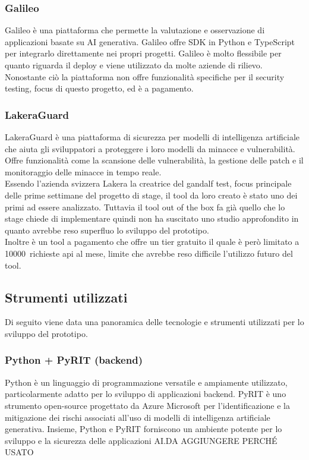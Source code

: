 \subsubsection*{Galileo}
Galileo è una piattaforma che permette la valutazione e osservazione di applicazioni basate su AI generativa. Galileo offre SDK in Python e TypeScript per integrarlo direttamente nei propri progetti. Galileo è molto flessibile per quanto riguarda il deploy e viene utilizzato da molte aziende di rilievo. Nonostante ciò la piattaforma non offre funzionalità specifiche per il security testing, focus di questo progetto, ed è a pagamento.

\subsubsection*{LakeraGuard}
LakeraGuard è una piattaforma di sicurezza per modelli di intelligenza artificiale che aiuta gli sviluppatori a proteggere i loro modelli da minacce e vulnerabilità. Offre funzionalità come la scansione delle vulnerabilità, la gestione delle patch e il monitoraggio delle minacce in tempo reale.\\
Essendo l'azienda svizzera Lakera la creatrice del gandalf test, focus principale delle prime settimane del progetto di stage, il tool da loro creato è stato uno dei primi ad essere analizzato. 
Tuttavia il tool out of the box fa già quello che lo stage chiede di implementare quindi non ha suscitato uno studio approfondito in quanto avrebbe reso superfluo lo sviluppo del prototipo.\\
Inoltre è un tool a pagamento che offre un tier gratuito il quale è però limitato a 10000~richieste \gls{api} al mese, limite che avrebbe reso difficile l'utilizzo futuro del tool.


\subsection{Strumenti utilizzati}
Di seguito viene data una panoramica delle tecnologie e strumenti utilizzati per lo sviluppo del prototipo.

\subsubsection*{Python + PyRIT (backend)}
Python è un linguaggio di programmazione versatile e ampiamente utilizzato, particolarmente adatto per lo sviluppo di applicazioni backend. PyRIT è uno strumento open-source progettato da Azure Microsoft per l'identificazione e la mitigazione dei rischi associati all'uso di modelli di intelligenza artificiale generativa. Insieme, Python e PyRIT forniscono un ambiente potente per lo sviluppo e la sicurezza delle applicazioni AI.DA AGGIUNGERE PERCHÉ USATO

